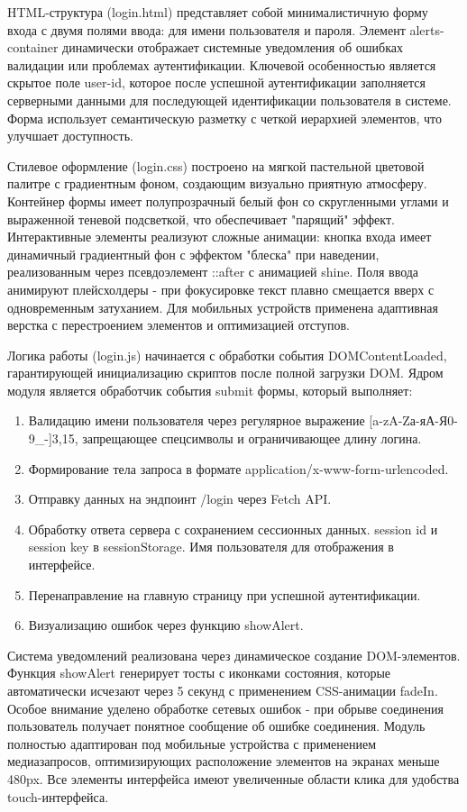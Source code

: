 HTML-структура (login.html) представляет собой минималистичную форму входа с двумя полями ввода: для имени пользователя и пароля. Элемент alerts-container динамически отображает системные уведомления об ошибках валидации или проблемах аутентификации. Ключевой особенностью является скрытое поле user-id, которое после успешной аутентификации заполняется серверными данными для последующей идентификации пользователя в системе. Форма использует семантическую разметку с четкой иерархией элементов, что улучшает доступность.

Стилевое оформление (login.css) построено на мягкой пастельной цветовой палитре с градиентным фоном, создающим визуально приятную атмосферу. Контейнер формы имеет полупрозрачный белый фон со скругленными углами и выраженной теневой подсветкой, что обеспечивает "парящий" эффект. Интерактивные элементы реализуют сложные анимации: кнопка входа имеет динамичный градиентный фон с эффектом "блеска" при наведении, реализованным через псевдоэлемент ::after с анимацией shine. Поля ввода анимируют плейсхолдеры - при фокусировке текст плавно смещается вверх с одновременным затуханием. Для мобильных устройств применена адаптивная верстка с перестроением элементов и оптимизацией отступов.

Логика работы (login.js) начинается с обработки события DOMContentLoaded, гарантирующей инициализацию скриптов после полной загрузки DOM. Ядром модуля является обработчик события submit формы, который выполняет:
\begin{enumerate}
	\item Валидацию имени пользователя через регулярное выражение [a-zA-Zа-яА-Я0-9\_-]{3,15}, запрещающее спецсимволы и ограничивающее длину логина.
	\item Формирование тела запроса в формате application/x-www-form-urlencoded.
	\item Отправку данных на эндпоинт /login через Fetch API.
	\item Обработку ответа сервера с сохранением сессионных данных. session id и session key в sessionStorage. Имя пользователя для отображения в интерфейсе.
	\item Перенаправление на главную страницу при успешной аутентификации.
	\item Визуализацию ошибок через функцию showAlert.
\end{enumerate}
Система уведомлений реализована через динамическое создание DOM-элементов. Функция showAlert генерирует тосты с иконками состояния, которые автоматически исчезают через 5 секунд с применением CSS-анимации fadeIn. Особое внимание уделено обработке сетевых ошибок - при обрыве соединения пользователь получает понятное сообщение об ошибке соединения.
Модуль полностью адаптирован под мобильные устройства с применением медиазапросов, оптимизирующих расположение элементов на экранах меньше 480px. Все элементы интерфейса имеют увеличенные области клика для удобства touch-интерфейса.
